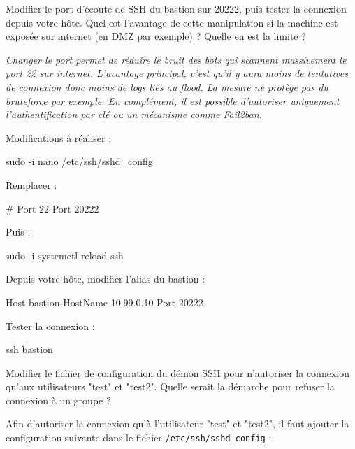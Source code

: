 \documentclass[a4paper,10pt]{exam}
\begin{document}
\begin{questions}
\question Modifier le port d'écoute de SSH du bastion sur 20222, puis tester la
  connexion depuis votre hôte. Quel est l'avantage de cette manipulation
  si la machine est exposée sur internet (en DMZ par exemple) ? Quelle
  en est la limite ?

\begin{solution}
\emph{Changer le port permet de réduire le bruit des bots qui
scannent massivement le port 22 sur internet. L'avantage
principal, c'est qu'il y aura moins de
tentatives de connexion donc moins de logs liés au flood. La mesure ne
protège pas du bruteforce par exemple. En complément, il est possible
d'autoriser uniquement l'authentification par clé ou un
mécanisme comme Fail2ban.}

Modifications à réaliser :

\begin{bashcode}
sudo -i
nano /etc/ssh/sshd_config
\end{bashcode}

Remplacer :

\begin{bashcode}
# Port 22
Port 20222
\end{bashcode}

Puis :

\begin{bashcode}
sudo -i
systemctl reload ssh
\end{bashcode}

Depuis votre hôte, modifier l'alias du bastion :

\begin{bashcode}
  Host bastion
      HostName 10.99.0.10
      Port 20222
\end{bashcode}

Tester la connexion :

\begin{bashcode}
ssh bastion
\end{bashcode}

\end{solution}

\question Modifier le fichier de configuration du démon SSH pour
  n'autoriser la connexion qu'aux
  utilisateurs "test" et "test2". Quelle serait la démarche pour refuser
  la connexion à un groupe ?



\begin{solution}
Afin d'autoriser la connexion qu'à
l'utilisateur "test" et "test2", il faut ajouter la
configuration suivante dans le fichier \texttt{/etc/ssh/sshd\_config} :


\end{solution}
\end{questions}
\end{document}
